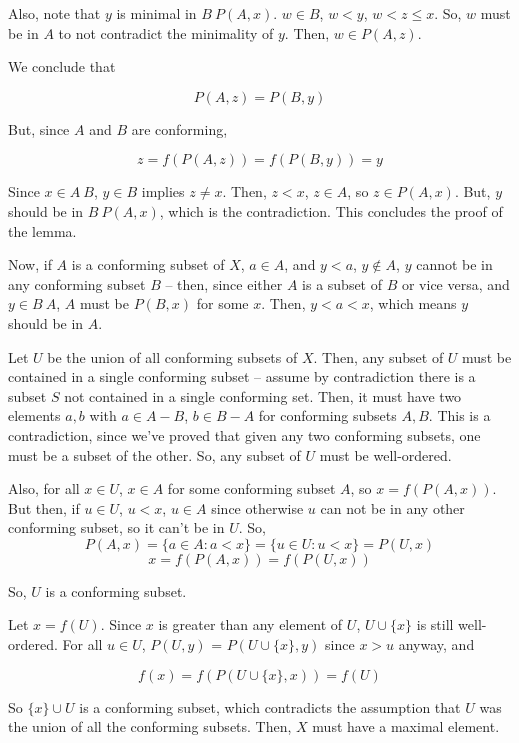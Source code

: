 \documentclass{article}
\begin{document}
        Also, note that $y$ is minimal in $B \ P(A,x)$. $w \in B$, $w < y$,
        $w<z \leq x$. So, $w$ must be in $A$ to not contradict the minimality of
        $y$. Then, $w \in P(A,z)$.

        We conclude that

        \[P(A,z) = P(B,y)\]

        But, since $A$ and $B$ are conforming,

        \[z = f(P(A,z)) = f(P(B,y)) = y\]

        Since $x \in A \ B$, $y \in B$ implies $z \neq x$. Then, $z < x$, $z \in
        A$, so $z \in P(A,x)$. But, $y$ should be in $B \ P(A,x)$, which is the
        contradiction. This concludes the proof of the lemma.

        Now, if $A$ is a conforming subset of $X$, $a \in A$, and $y < a$, $y
        \notin A$, $y$ cannot be in any conforming subset $B$ -- then, since
        either $A$ is a subset of $B$ or vice versa, and $y \in B \ A$, $A$ must
        be $P(B,x)$ for some $x$. Then, $y < a < x$, which means $y$ should be
        in $A$.

        Let $U$ be the union of all conforming subsets of $X$. Then, any subset
        of $U$ must be contained in a single conforming subset -- assume by
        contradiction there is a subset $S$ not contained in a single conforming
        set. Then, it must have two elements $a, b$ with $a \in A - B$, $b \in B
        - A$ for conforming subsets $A, B$. This is a contradiction, since we've
        proved that given any two conforming subsets, one must be a subset of
        the other. So, any subset of $U$ must be well-ordered.

        Also, for all $x \in U$, $x \in A$ for some conforming subset $A$, so
        $x = f(P(A,x))$. But then, if $u \in U$, $u < x$, $u \in A$ since
        otherwise $u$ can not be in any other conforming subset, so it can't be
        in $U$. So,
        \[P(A,x) = \{a \in A: a < x\} = \{u \in U: u < x\} = P(U,x)\]
        \[x = f(P(A,x)) = f(P(U,x))\]

        So, $U$ is a conforming subset.

        Let $x = f(U)$. Since $x$ is greater than any element of $U$, $U \cup
        \{x\}$ is still well-ordered. For all $u \in U$, $P(U,y)$ = $P(U
        \cup\{x\},y)$ since $x>u$ anyway, and

        \[f(x) = f(P(U \cup \{x\}, x)) = f(U)\]

        So $\{x\} \cup U$ is a conforming subset, which contradicts the
        assumption that $U$ was the union of all the conforming subsets. Then,
        $X$ must have a maximal element.
\end{document}
